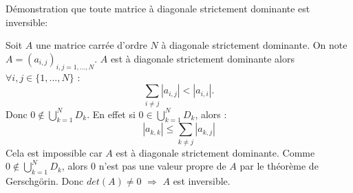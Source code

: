 \documentclass[a4paper,11pt]{article}
\begin{document}
	Démonstration que toute matrice à diagonale strictement dominante est inversible:

	Soit $A$ une matrice carrée d'ordre $N$ à diagonale strictement dominante. On note $A = (a_{i,j})_{i,j=1,...,N}$.
	$A$ est à diagonale strictement dominante alors $\forall i, j \in \{1, ..., N\}$ :
	\begin{equation*}
		\sum\limits_{i \neq j} |a_{i, j}| < |a_{i, i}|.
	\end{equation*}
	Donc $0 \notin \bigcup\limits_{k=1}^{N} D_{k}$. En effet si $0 \in \bigcup\limits_{k=1}^{N} D_{k}$, alors :
	\begin{equation*}
		|a_{k, k}| \leqslant \sum\limits_{k \neq j} |a_{k, j}|
	\end{equation*}
	Cela est impossible car $A$ est à diagonale strictement dominante.
	Comme $0 \notin \bigcup\limits_{k=1}^{N} D_{k}$, alors $0$ n'est pas une valeur propre de $A$ par le théorème de Gerschgörin.
	Donc $det(A) \neq 0$ $\Longrightarrow$ $A$ est inversible.
\end{document}
